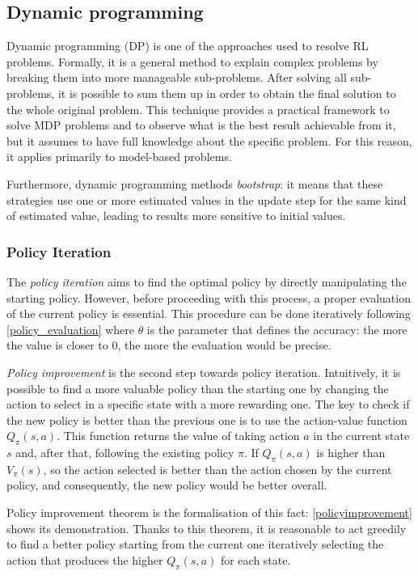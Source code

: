 \subsection{Dynamic programming} \label{dp}

Dynamic programming (DP) is one of the approaches used to resolve RL problems. Formally, it is a general method to explain complex problems by breaking them into more manageable sub-problems. After solving all sub-problems, it is possible to sum them up in order to obtain the final solution to the whole original problem. 
This technique provides a practical framework to solve MDP problems and to observe what is the best result achievable from it, but it assumes to have full knowledge about the specific problem. For this reason, it applies primarily to model-based problems.

Furthermore, dynamic programming methods \textit{bootstrap}: it means that these strategies use one or more estimated values in the update step for the same kind of estimated value, leading to results more sensitive to initial values.

\subsubsection{Policy Iteration}

The \textit{policy iteration} aims to find the optimal policy by directly manipulating the starting policy. However, before proceeding with this process, a proper evaluation of the current policy is essential. This procedure can be done iteratively following \vref{policy_evaluation} where $\theta$ is the parameter that defines the accuracy: the more the value is closer to $0$, the more the evaluation would be precise.

\textit{Policy improvement} is the second step towards policy iteration. Intuitively, it is possible to find a more valuable policy than the starting one by changing the action to select in a specific state with a more rewarding one.  The key to check if the new policy is better than the previous one is to use the action-value function $Q_\pi(s,a)$. This function returns the value of taking action $a$ in the current state $s$ and, after that, following the existing policy $\pi$. If $Q_\pi(s,a)$ is higher than $V_\pi(s)$, so the action selected is better than the action chosen by the current policy, and consequently, the new policy would be better overall.

Policy improvement theorem is the formalisation of this fact: \vref{policyimprovement} shows its demonstration. Thanks to this theorem, it is reasonable to act greedily to find a better policy starting from the current one iteratively selecting the action that produces the higher  $Q_\pi(s, a)$ for each state.

